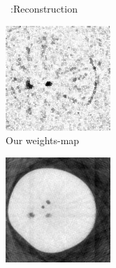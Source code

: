 \documentclass{article}
\begin{document}
\begin{figure}[!h]
\begin{subfigure}[b]{0.24\linewidth}
        \caption{~\cite{Lee2012}:Reconstruction}
    \end{subfigure}
    \begin{subfigure}[b]{0.24\linewidth}
        \includegraphics[width=\textwidth]{../images/comparison_lit/weightsIm_all_methods30.png}
        \caption{Our weights-map}
    \end{subfigure}
        \begin{subfigure}[b]{0.24\linewidth}
        \includegraphics[width=\textwidth]{../images/comparison_lit/weighted_pca_all_methods30.png}

\end{subfigure}
\end{figure}
\end{document}
